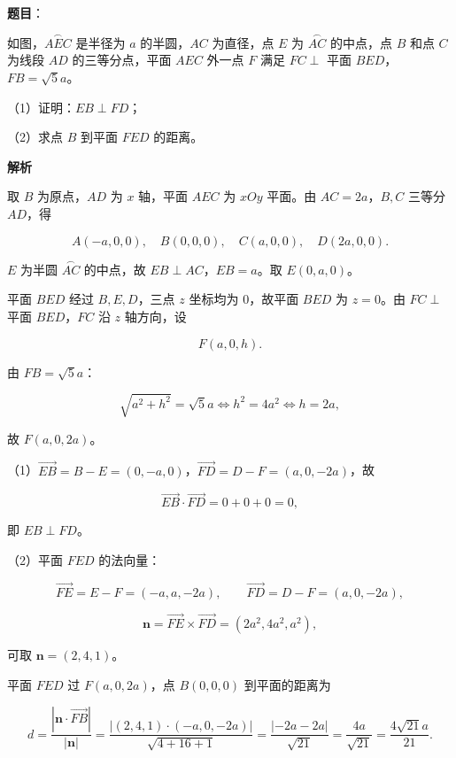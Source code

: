 \begin{answer}

\textbf{题目}：

如图，$\overset{\frown}{AEC}$ 是半径为 $a$ 的半圆，$AC$ 为直径，点 $E$ 为 $\overset{\frown}{AC}$ 的中点，点 $B$ 和点 $C$ 为线段 $AD$ 的三等分点，平面 $AEC$ 外一点 $F$ 满足 $FC\perp$ 平面 $BED$，$FB=\sqrt5a$。

（1）证明：$EB\perp FD$；

（2）求点 $B$ 到平面 $FED$ 的距离。
\nopagebreak[4]
\begin{center}\end{center}
\nopagebreak[4]
\textbf{解析}

取 $B$ 为原点，$AD$ 为 $x$ 轴，平面 $AEC$ 为 $xOy$ 平面。由 $AC=2a$，$B,C$ 三等分 $AD$，得

\nopagebreak[4]
\[A(-a,0,0),\quad B(0,0,0),\quad C(a,0,0),\quad D(2a,0,0).\]

$E$ 为半圆 $\overset{\frown}{AC}$ 的中点，故 $EB\perp AC$，$EB=a$。取 $E(0,a,0)$。

平面 $BED$ 经过 $B,E,D$，三点 $z$ 坐标均为 $0$，故平面 $BED$ 为 $z=0$。由 $FC\perp$ 平面 $BED$，$FC$ 沿 $z$ 轴方向，设

\nopagebreak[4]
\[F(a,0,h).\]

由 $FB=\sqrt5a$：

\nopagebreak[4]
\[\sqrt{a^2+h^2}=\sqrt5a\iff h^2=4a^2\iff h=2a,\]

故 $F(a,0,2a)$。

（1）$\overrightarrow{EB}=B-E=(0,-a,0)$，$\overrightarrow{FD}=D-F=(a,0,-2a)$，故

\nopagebreak[4]
\[\overrightarrow{EB}\cdot\overrightarrow{FD}=0+0+0=0,\]

即 $EB\perp FD$。

（2）平面 $FED$ 的法向量：

\nopagebreak[4]
\[\overrightarrow{FE}=E-F=(-a,a,-2a),\qquad \overrightarrow{FD}=D-F=(a,0,-2a),\]

\nopagebreak[4]
\[\boldsymbol n=\overrightarrow{FE}\times\overrightarrow{FD}
=(2a^2,4a^2,a^2),\]

可取 $\boldsymbol n=(2,4,1)$。

平面 $FED$ 过 $F(a,0,2a)$，点 $B(0,0,0)$ 到平面的距离为

\nopagebreak[4]
\[d=\frac{|\boldsymbol n\cdot\overrightarrow{FB}|}{|\boldsymbol n|}
=\frac{|(2,4,1)\cdot(-a,0,-2a)|}{\sqrt{4+16+1}}
=\frac{|-2a-2a|}{\sqrt{21}}
=\frac{4a}{\sqrt{21}}
=\frac{4\sqrt{21}a}{21}.\]


\end{answer}
